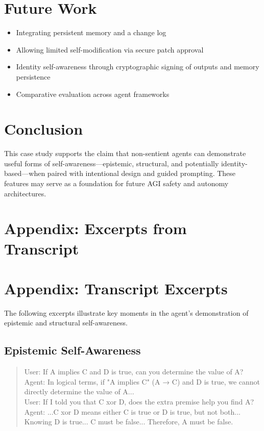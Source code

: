 \documentclass[11pt]{article}
\begin{document}
\section{Future Work}
\begin{itemize}
    \item Integrating persistent memory and a change log
    \item Allowing limited self-modification via secure patch approval
    \item Identity self-awareness through cryptographic signing of outputs and memory persistence
    \item Comparative evaluation across agent frameworks
\end{itemize}

\section{Conclusion}
This case study supports the claim that non-sentient agents can demonstrate useful forms of self-awareness---epistemic, structural, and potentially identity-based---when paired with intentional design and guided prompting. These features may serve as a foundation for future AGI safety and autonomy architectures.

\section*{Appendix: Excerpts from Transcript}
\appendix
\section*{Appendix: Transcript Excerpts}

The following excerpts illustrate key moments in the agent's demonstration of epistemic and structural self-awareness.

\subsection*{Epistemic Self-Awareness}
\begin{quote}
User: If A implies C and D is true, can you determine the value of A?\\
Agent: In logical terms, if "A implies C" (A → C) and D is true, we cannot directly determine the value of A...\\
User: If I told you that C xor D, does the extra premise help you find A?\\
Agent: ...C xor D means either C is true or D is true, but not both... Knowing D is true... C must be false... Therefore, A must be false.
\end{quote}
\end{document}
